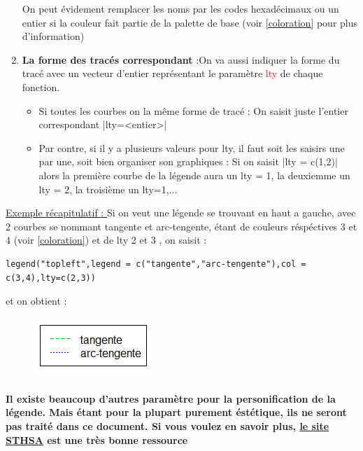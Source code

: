 \documentclass{article}
\newcommand{\argument}[1]{\textcolor{red}{#1}}
\begin{document}
\begin{enumerate}
    On peut évidement remplacer les noms par les codes hexadécimaux ou un entier si la couleur fait partie de la palette de base (voir \ref{coloration} pour plus d'information)
    \item \textbf{La forme des tracés correspondant} :\newline On va aussi indiquer la forme du tracé avec un vecteur d'entier représentant le paramètre \argument{lty} de chaque fonction.
    \begin{itemize}
        \item Si toutes les courbes on la même forme de tracé : \newline On saisit juste l'entier correspondant
        |lty=<entier>|
        \item Par contre, si il y a plusieurs valeurs pour lty, il faut soit les saisirs une par une, soit bien organiser son graphiques : \newline Si on saisit |lty = c(1,2)| alors la première courbe de la légende aura un lty = 1, la deuxiemme un lty = 2, la troisième un lty=1,... 
    \end{itemize}
    

\end{enumerate}
\newpage
\underline{Exemple récapitulatif : }\newline Si on veut une légende se trouvant en haut a gauche, avec 2 courbes se nommant tangente et arc-tengente, étant de couleurs réspéctives 3 et 4 (voir \ref{coloration}) et de lty 2 et 3 , on saisit : 
\begin{verbatim}
legend("topleft",legend = c("tangente","arc-tengente"),col = c(3,4),lty=c(2,3))
\end{verbatim}
et on obtient : 

\begin{figure}[!h]
    \includegraphics[scale=0.8]{legende.PNG}
\end{figure}

\paragraph{Il existe beaucoup d'autres paramètre pour la personification de la légende. Mais étant pour la plupart purement éstétique, ils ne seront pas traité dans ce document. Si vous voulez en savoir plus, \href{http://www.sthda.com/french/wiki/ajouter-une-legende-aux-graphiques-avec-le-logiciel-r-comment-prendre-le-controle}{\underline{le site STHSA}} est une très bonne ressource}
\end{document}
